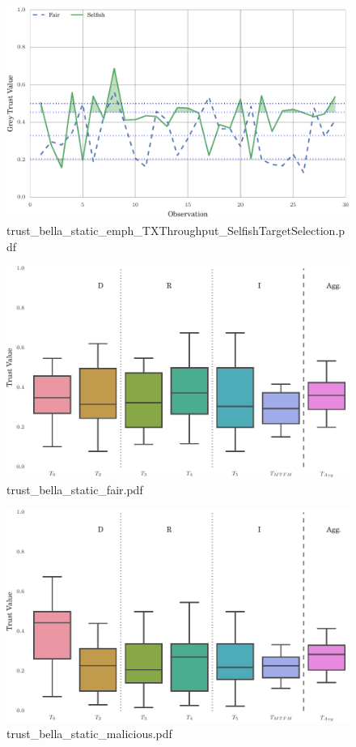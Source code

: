 \documentclass{article}
\begin{document}
\begin{figure}[h!]
\centering
\includegraphics[width=\linewidth]{trust_bella_static_emph_TXThroughput_SelfishTargetSelection.pdf}
\caption{trust\_bella\_static\_emph\_TXThroughput\_SelfishTargetSelection.pdf}
\end{figure}




\begin{figure}[h!]
\centering
\includegraphics[width=\linewidth]{trust_bella_static_fair.pdf}
\caption{trust\_bella\_static\_fair.pdf}
\end{figure}




\begin{figure}[h!]
\centering
\includegraphics[width=\linewidth]{trust_bella_static_malicious.pdf}
\caption{trust\_bella\_static\_malicious.pdf}
\end{figure}
\end{document}
